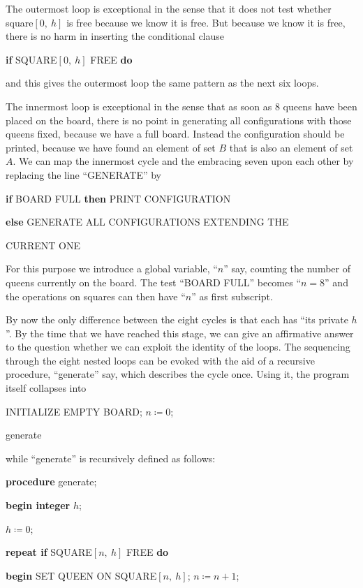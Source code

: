 \documentclass[twoside,11pt]{book}
\begin{document}
The outermost loop is exceptional in the sense that it does not test whether square$[0,\ h]$ is free because we know it is free. But because we know it is free, there is no harm in inserting the conditional clause

\quad \textbf{if} SQUARE$[0,\ h]$ FREE \textbf{do}

\noindent
and this gives the outermost loop the same pattern as the next six loops.

The innermost loop is exceptional in the sense that as soon as 8 queens have been placed on the board, there is no point in generating all configurations with those queens fixed, because we have a full board. Instead the configuration should be printed, because we have found an element of set $B$ that is also an element of set $A$. We can map the innermost cycle and the embracing seven upon each other by replacing the line ``GENERATE'' by

\textbf{if} BOARD FULL \textbf{\textbf{then}} PRINT CONFIGURATION

\quad \textbf{else} GENERATE ALL CONFIGURATIONS EXTENDING THE

\quad\quad CURRENT ONE

For this purpose we introduce a global variable, ``$n$'' say, counting the number of queens currently on the board. The test ``BOARD FULL'' becomes ``$n = 8$'' and the operations on squares can then have ``$n$'' as first subscript.

By now the only difference between the eight cycles is that each has ``its private $h$''. By the time that we have reached this stage, we can give an affirmative answer to the question whether we can exploit the identity of the loops. The sequencing through the eight nested loops can be evoked with the aid of a recursive procedure, ``generate'' say, which describes the cycle once. Using it, the program itself collapses into

\quad INITIALIZE EMPTY BOARD; $n \coloneq 0$;

\quad generate

\noindent
while ``generate'' is recursively defined as follows:

\textbf{procedure} generate;

\textbf{begin integer} $h$;

$h \coloneq 0$;

\textbf{repeat if} SQUARE$[n,\ h]$ FREE \textbf{do}

\quad \textbf{\textbf{begin}} SET QUEEN ON SQUARE$[n,\ h]$; $n \coloneq n + 1$;
\end{document}
